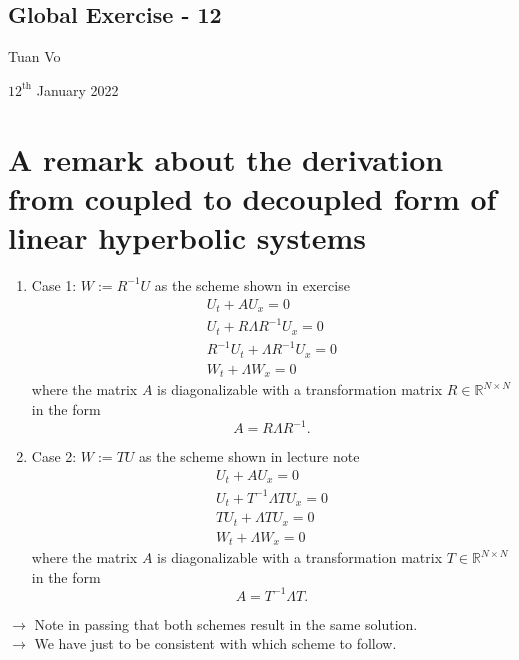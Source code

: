 \documentclass[12pt]{article}
\begin{document}
\begin{center}
	\section*{Global Exercise - 12}
\end{center}
\begin{center}
	Tuan Vo
\end{center}
\begin{center}
	$12^{\text{th}}$ January 2022
\end{center}
\section{A remark about the derivation from coupled to decoupled form of linear hyperbolic systems}
\begin{enumerate}
	\item Case 1: $W:=R^{-1}U$ as the scheme shown in exercise
	      \begin{equation*}
		      \boxed{
			      \begin{aligned}
				      U_{t} + AU_{x} = 0                     \\
				      U_{t} + R\Lambda R^{-1} U_{x} = 0      \\
				      R^{-1}U_{t} + \Lambda R^{-1} U_{x} = 0 \\
				      W_{t} + \Lambda W_{x} = 0                    
			      \end{aligned}
		      }
	      \end{equation*}
	      where the matrix $A$ is diagonalizable with a transformation matrix $R \in \mathbb{R}^{N\times N}$ in the form 
	      $$A=R\Lambda R^{-1}.$$
	      
	\item Case 2: $W:=TU$ as the scheme shown in lecture note
	      \begin{equation*}
		      \boxed{
			      \begin{aligned}
				      U_{t} + AU_{x} = 0                \\
				      U_{t} + T^{-1}\Lambda T U_{x} = 0 \\
				      TU_{t} + \Lambda TU_{x} = 0       \\
				      W_{t} + \Lambda W_{x} = 0                      
			      \end{aligned}
		      }
	      \end{equation*}
	      where the matrix $A$ is diagonalizable with a transformation matrix $T \in \mathbb{R}^{N\times N}$ in the form 
	      $$A= T^{-1} \Lambda T.$$
\end{enumerate}
$\rightarrow$ Note in passing that both schemes result in the same solution.\\ 
$\rightarrow$ We have just to be consistent with which scheme to follow.
\end{document}
